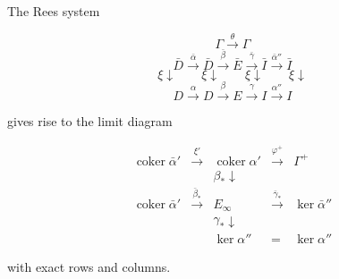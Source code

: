 The Rees system

$$\Gamma \xrightarrow{\theta} \Gamma$$
$$\bar{D} \xrightarrow{\bar{\alpha}} \bar{D} \xrightarrow{\bar{\beta}} \bar{E} \xrightarrow{\bar{\gamma}} \bar{I} \xrightarrow{\bar{\alpha}''} \bar{I}$$
$$\xi \downarrow \qquad \xi \downarrow \qquad \xi \downarrow \qquad \xi \downarrow$$
$$D \xrightarrow{\alpha} D \xrightarrow{\beta} E \xrightarrow{\gamma} I \xrightarrow{\alpha''} I$$

gives rise to the limit diagram

$$\begin{array}{ccccc}
\operatorname{coker} \bar{\alpha}' & \xrightarrow{\xi'} & \operatorname{coker} \alpha' & \xrightarrow{\varphi^+} & \Gamma^+ \\
& & \beta_* \downarrow & & \\
\operatorname{coker} \bar{\alpha}' & \xrightarrow{\bar{\beta}_*} & E_\infty & \xrightarrow{\bar{\gamma}_*} & \ker \bar{\alpha}'' \\
& & \gamma_* \downarrow & & \\
& & \ker \alpha'' & = & \ker \alpha''
\end{array}$$

with exact rows and columns.
